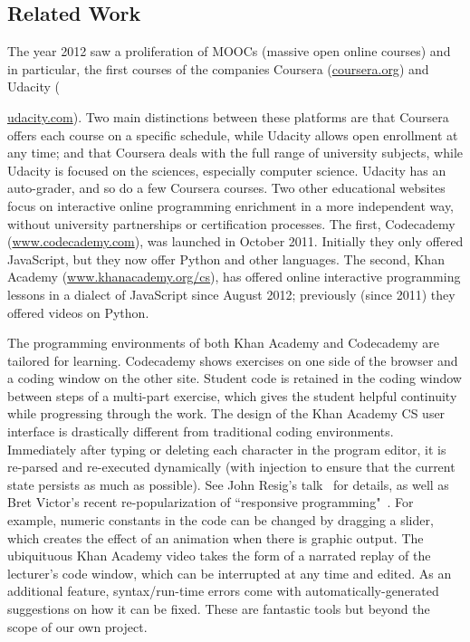 \documentclass{article}
\begin{document}
\subsection{Related Work}\label{sec:related}
The year 2012 saw a proliferation of MOOCs (massive open online courses) and in particular, the first courses of the companies Coursera (\url{coursera.org}) and Udacity ({\url{udacity.com}). Two main distinctions between these platforms are that Coursera offers each course on a specific schedule, while Udacity allows open enrollment at any time; and that Coursera deals with the full range of university subjects, while Udacity is focused on the sciences, especially computer science. Udacity has an auto-grader, and so do a few Coursera courses. Two other educational websites focus on interactive online programming enrichment in a more independent way, without university partnerships or certification processes. The first, Codecademy (\url{www.codecademy.com}), was launched in October 2011. Initially they only offered JavaScript, but they now offer Python and other languages. The second, Khan Academy (\url{www.khanacademy.org/cs}), has offered online interactive programming lessons in a dialect of JavaScript since August 2012; previously (since 2011) they offered videos on Python. 

The programming environments of both Khan Academy and Codecademy are tailored for learning. Codecademy shows exercises on one side of the browser and a coding window on the other site. Student code is retained in the coding window between steps of a multi-part exercise, which gives the student helpful continuity while progressing through the work. The design of the Khan Academy CS user interface is drastically different from traditional coding environments. Immediately after typing or deleting each character in the program editor, it is re-parsed and re-executed dynamically (with injection to ensure that the current state persists as much as possible). See John Resig's talk~\cite{Resig12} for details, as well as Bret Victor's recent re-popularization of ``responsive programming"~\cite{Victor12}. For example, numeric constants in the code can be changed by dragging a slider, which creates the effect of an animation when there is graphic output. The ubiquituous Khan Academy video takes the form of a narrated replay of the lecturer's code window, which can be interrupted at any time and edited. As an additional feature, syntax/run-time errors come with automatically-generated suggestions on how it can be fixed. These are fantastic tools but beyond the scope of our own project.

}
\end{document}
